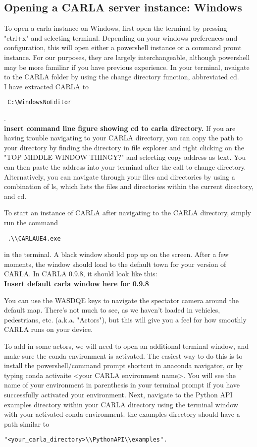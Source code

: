 \documentclass{article}
\begin{document}
\subsection{Opening a CARLA server instance: Windows}
\label{sec:CARLAserverwindows}
To open a carla instance on Windows, first open the terminal by pressing "ctrl+x" and selecting terminal. Depending on your windows preferences and configuration, this will open either a powershell instance or a command promt instance. For our purposes, they are largely interchangeable, although powershell may be more familiar if you have previous experience. In your terminal, nvaigate to the CARLA folder by using the change directory function, abbreviated cd. 
\\
I have extracted CARLA to \begin{verbatim} C:\WindowsNoEditor \end{verbatim}.
\\
 \textbf{insert command line figure showing cd to carla directory.}
If you are having trouble navigating to your CARLA directory, you can copy the path to your directory by finding the directory in file explorer and  right clicking on the "TOP MIDDLE WINDOW THINGY?" and selecting copy address as text. You can then paste the address into your terminal after the call to change directory.
Alternatively, you can navigate through your files and directories by using a combination of ls, which lists the files and directories within the current directory, and cd. 

To start an instance of CARLA after navigating to the CARLA directory, simply run the command \begin{verbatim} .\\CARLAUE4.exe \end{verbatim} in the terminal. A black window should pop up on the screen. After a few moments, the window should load to the default town for your version of CARLA. In CARLA 0.9.8, it should look like this:
\\ 
\textbf{Insert default carla window here for 0.9.8}

You can use the WASDQE keys to navigate the spectator camera around the default map. There's not much to see, as we haven't loaded in vehicles, pedestrians, etc. (a.k.a. "Actors"), but this will give you a feel for how smoothly CARLA runs on your device.

To add in some actors, we will need to open an additional terminal window, and make sure the conda environment is activated. The easiest way to do this is to install the powershell/command prompt shortcut in anaconda navigator, or by typing conda activaite <your CARLA environment name>. You will see the name of your environment in parenthesis in your terminal prompt if you have successfully activated your environment. Next, navigate to the Python API examples directory within your CARLA directory using the terminal window with your activated conda environment. the examples directory should have a path similar to \begin{verbatim}"<your_carla_directory>\\PythonAPI\\examples".  \end{verbatim}
\end{document}
